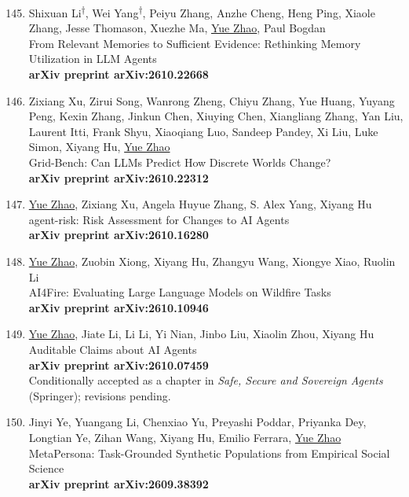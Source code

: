 \documentclass[margin,line,pifont,palatino,courier]{res}
\newcommand{\equalcontrib}{\textsuperscript{$\dagger$}}
\newenvironment{benumerate}[1]{
    \let\oldItem\item
    \def\item{\addtocounter{enumi}{-2}\oldItem}
    \begin{enumerate}[leftmargin=0.25in,label=\textcolor{uscred}{\arabic*.}]
    \setcounter{enumi}{#1}
    \addtocounter{enumi}{1}
}{
    \end{enumerate}
}
\begin{document}
\begin{resume}
\begin{benumerate}{144}
    \item
    Shixuan Li\equalcontrib, Wei Yang\equalcontrib, Peiyu Zhang, Anzhe Cheng, Heng Ping, Xiaole Zhang, Jesse Thomason, Xuezhe Ma, \underline{Yue Zhao}, Paul Bogdan\\
    From Relevant Memories to Sufficient Evidence: Rethinking Memory Utilization in LLM Agents\\
    \textbf{arXiv preprint arXiv:2610.22668}

    \item
    Zixiang Xu, Zirui Song, Wanrong Zheng, Chiyu Zhang, Yue Huang, Yuyang Peng, Kexin Zhang, Jinkun Chen, Xiuying Chen, Xiangliang Zhang, Yan Liu, Laurent Itti, Frank Shyu, Xiaoqiang Luo, Sandeep Pandey, Xi Liu, Luke Simon, Xiyang Hu, \underline{Yue Zhao}\\
    Grid-Bench: Can LLMs Predict How Discrete Worlds Change?\\
    \textbf{arXiv preprint arXiv:2610.22312}

    \item
    \underline{Yue Zhao}, Zixiang Xu, Angela Huyue Zhang, S. Alex Yang, Xiyang Hu\\
    agent-risk: Risk Assessment for Changes to AI Agents\\
    \textbf{arXiv preprint arXiv:2610.16280}

    \item
    \underline{Yue Zhao}, Zuobin Xiong, Xiyang Hu, Zhangyu Wang, Xiongye Xiao, Ruolin Li\\
    AI4Fire: Evaluating Large Language Models on Wildfire Tasks\\
    \textbf{arXiv preprint arXiv:2610.10946}

    \item
    \underline{Yue Zhao}, Jiate Li, Li Li, Yi Nian, Jinbo Liu, Xiaolin Zhou, Xiyang Hu\\
    Auditable Claims about AI Agents\\
    \textbf{arXiv preprint arXiv:2610.07459}\\
    Conditionally accepted as a chapter in \textit{Safe, Secure and Sovereign Agents} (Springer); revisions pending.

    \item
    Jinyi Ye, Yuangang Li, Chenxiao Yu, Preyashi Poddar, Priyanka Dey, Longtian Ye, Zihan Wang, Xiyang Hu, Emilio Ferrara, \underline{Yue Zhao}\\
    MetaPersona: Task-Grounded Synthetic Populations from Empirical Social Science\\
    \textbf{arXiv preprint arXiv:2609.38392}


\end{benumerate}
\end{resume}
\end{document}
